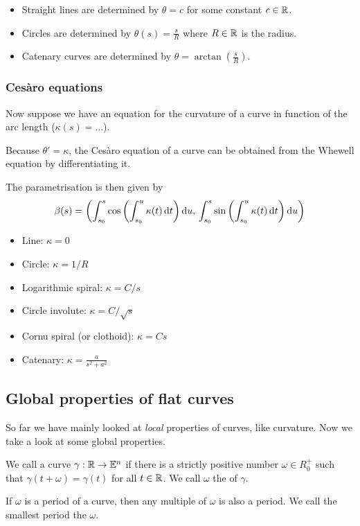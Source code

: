 \begin{example}
\begin{itemize}
\item Straight lines are determined by $\theta = c$ for some constant $c\in\mathbb{R}$.
\item Circles are determined by $\theta(s) = \frac{s}{R}$ where $R\in \mathbb{R}$ is the radius.
\item Catenary curves are determined by $\theta = \arctan \left(\frac{s}{R}\right)$.
\end{itemize}
\end{example}
\subsubsection{Cesàro equations}
Now suppose we have an equation for the curvature of a curve in function of the arc length ($\kappa(s) = \ldots$).

Because $\theta' = \kappa$, the Cesàro equation of a curve can be obtained from the Whewell equation by differentiating it.

The parametrisation is then given by
\[ \beta(s) = \left(\int_{s_0}^s\cos\left(\int_{s_0}^u\kappa(t)\operatorname{d \!}{t}\right) \operatorname{d \!}{u},\, \int^s_{s_0}\sin\left(\int_{s_0}^u\kappa(t)\operatorname{d \!}{t}\right) \operatorname{d \!}{u}\right) \]

\begin{example}
\begin{itemize}
\item Line: $\kappa = 0$
\item Circle: $\kappa = 1/R$
\item Logarithmic spiral: $\kappa = C / s$
\item Circle involute: $\kappa = C / \sqrt{s}$
\item Cornu spiral (or clothoid): $\kappa = Cs$
\item Catenary: $\kappa = \frac{a}{s^2 + a^2}$
\end{itemize}
\end{example}

\subsection{Global properties of flat curves}
So far we have mainly looked at \textit{local} properties of curves, like curvature. Now we take a look at some global properties.

\begin{definition}
We call a curve $\gamma:\mathbb{R}\to\mathbb{E}^n$  if there is a strictly positive number $\omega \in R_0^+$ such that $\gamma(t+\omega) = \gamma(t)$ for all $t\in \mathbb{R}$. We call $\omega$ the  of $\gamma$.

If $\omega$ is a period of a curve, then any multiple of $\omega$ is also a period. We call the smallest period the  $\omega$.
\end{definition}

